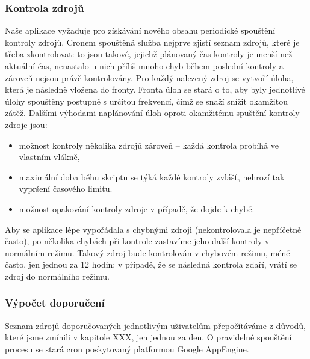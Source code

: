 \subsubsection{Kontrola zdrojů}

Naše aplikace vyžaduje pro získávání nového obsahu periodické spouštění kontroly zdrojů.
Cronem spouštěná služba nejprve zjistí seznam zdrojů, které je třeba zkontrolovat: to jsou takové, jejichž plánovaný čas kontroly je menší než aktuální čas, nenastalo u nich příliš mnoho chyb během poslední kontroly a zároveň nejsou právě kontrolovány.
Pro každý nalezený zdroj se vytvoří úloha, která je následně vložena do fronty.
Fronta úloh se stará o to, aby byly jednotlivé úlohy spouštěny postupně s určitou frekvencí, čímž se snaží snížit okamžitou zátěž.
Dalšími výhodami naplánování úloh oproti okamžitému spuštění kontroly zdroje jsou:
\begin{itemize}
	\item možnost kontroly několika zdrojů zároveň -- každá kontrola probíhá ve vlastním vlákně,
	\item maximální doba běhu skriptu se týká každé kontroly zvlášť, nehrozí tak vypršení časového limitu.
	\item možnost opakování kontroly zdroje v případě, že dojde k chybě.
\end{itemize}

Aby se aplikace lépe vypořádala s chybnými zdroji (nekontrolovala je nepříčetně často), po několika chybách při kontrole zastavíme jeho další kontroly v normálním režimu.
Takový zdroj bude kontrolován v chybovém režimu, méně často, jen jednou za 12 hodin; v případě, že se následná kontrola zdaří, vrátí se zdroj do normálního režimu.

\subsubsection{Výpočet doporučení}

Seznam zdrojů doporučovaných jednotlivým uživatelům přepočítáváme z důvodů, které jsme zmínili v kapitole XXX, jen jednou za den.
O pravidelné spouštění procesu se stará cron poskytovaný platformou Google AppEngine.

